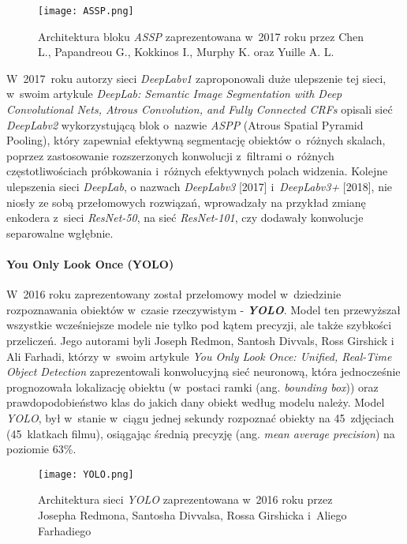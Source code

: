 \begin{figure}[!h]
    \centering \texttt{[image: ASSP.png]}
    \captionsetup{format=hang}
    \caption{Architektura bloku \emph{ASSP} zaprezentowana w~2017 roku przez Chen L., Papandreou G., Kokkinos I., Murphy K. oraz Yuille A. L. \cite{chen2}}
    \label{fig:assp1}
\end{figure}

W~2017~roku autorzy sieci \emph{DeepLabv1} zaproponowali duże ulepszenie tej sieci, w~swoim artykule \emph{DeepLab: Semantic Image Segmentation with Deep Convolutional Nets, Atrous Convolution, and Fully Connected CRFs} \cite{chen2} opisali sieć \emph{DeepLabv2} wykorzystującą blok o~nazwie \emph{ASPP} (Atrous Spatial Pyramid Pooling), który zapewniał efektywną segmentację obiektów o~różnych skalach, poprzez zastosowanie rozszerzonych konwolucji z~filtrami o~różnych częstotliwościach próbkowania i~różnych efektywnych polach widzenia. Kolejne ulepszenia sieci \emph{DeepLab}, o nazwach \emph{DeepLabv3} [2017] i~\emph{DeepLabv3+} [2018], nie niosły ze sobą przełomowych rozwiązań, wprowadzały na przykład zmianę enkodera z~sieci \emph{ResNet-50}, na sieć \emph{ResNet-101}, czy dodawały konwolucje separowalne wgłębnie.

\paragraph*{You Only Look Once (YOLO)}

W~2016 roku zaprezentowany został przełomowy model w~dziedzinie rozpoznawania obiektów w~czasie rzeczywistym - \textbf{\emph{YOLO}}. Model ten przewyższał wszystkie wcześniejsze modele nie tylko pod kątem precyzji, ale także szybkości przeliczeń. Jego autorami byli Joseph Redmon, Santosh Divvals, Ross Girshick i Ali Farhadi, którzy w~swoim artykule \emph{You Only Look Once: Unified, Real-Time Object Detection} \cite{redmon} zaprezentowali konwolucyjną sieć neuronową, która jednocześnie prognozowała lokalizację obiektu (w~postaci ramki (ang. \emph{bounding box})) oraz prawdopodobieństwo klas do jakich dany obiekt według modelu należy. Model \emph{YOLO}, był w~stanie w~ciągu jednej sekundy rozpoznać obiekty na 45~zdjęciach (45~klatkach filmu), osiągając średnią precyzję (ang. \emph{mean average precision}) na poziomie 63\%.

\begin{figure}[!h]
    \centering \texttt{[image: YOLO.png]}
    \captionsetup{format=hang}
    \caption{Architektura sieci \emph{YOLO} zaprezentowana w~2016 roku przez Josepha Redmona, Santosha Divvalsa, Rossa Girshicka i~Aliego Farhadiego \cite{redmon}}
    \label{fig:yolo1}
\end{figure}

